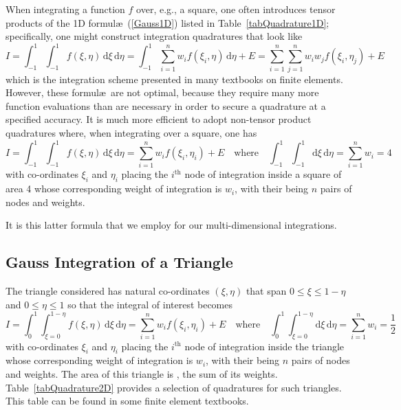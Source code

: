When integrating a function $f$ over, e.g., a square, one often introduces tensor products of the 1D formul\ae\ (\ref{Gauss1D}) listed in Table~\ref{tabQuadrature1D}; specifically, one might construct integration quadratures that look like
\begin{displaymath}
    I = \int_{-1}^1 \int_{-1}^1 f ( \xi , \eta ) \, \mathrm{d} \xi \, \mathrm{d} \eta =
    \int_{-1}^1 \sum_{i=1}^n w_i f ( \xi_i , \eta ) \, \mathrm{d} \eta + E =
    \sum_{i=1}^n \sum_{j=1}^n w_i w_j f ( \xi_i , \eta_ j ) + E 
\end{displaymath}
which is the integration scheme presented in many textbooks on finite elements.  However, these formul\ae\ are not optimal, because they require many more function evaluations than are necessary in order to secure a quadrature at a specified accuracy.  It is much more efficient to adopt non-tensor product quadratures where, when integrating over a square, one has
\begin{displaymath}
    I = \int_{-1}^1 \int_{-1}^1 f ( \xi , \eta ) \, \mathrm{d} \xi \, \mathrm{d} \eta =
    \sum_{i=1}^n w_i f ( \xi_i , \eta_i ) + E
    \quad \text{where} \quad
    \int_{-1}^1 \int_{-1}^1 \mathrm{d} \xi \, \mathrm{d} \eta = 
    \sum_{i=1}^n w_i = 4
\end{displaymath}
with co-ordinates $\xi_i$ and $\eta_i$ placing the $i^{\text{th}}$ node of integration inside a square of area 4 whose corresponding weight of integration is $w_i$, with their being $n$ pairs of nodes and weights.  

It is this latter formula that we employ for our multi-dimensional integrations.

\subsection{Gauss Integration of a Triangle}

The triangle considered has natural co-ordinates $( \xi , \eta )$ that span $0 \leq \xi \leq 1-\eta$ and $0 \leq \eta \leq 1$ so that the integral of interest becomes
\begin{equation}
I = \int_0^1 \int_{\xi =0}^{1-\eta} f ( \xi , \eta ) \, \mathrm{d} \xi \, \mathrm{d} \eta =
\sum_{i=1}^n w_i f ( \xi_i , \eta_i ) + E
\quad \text{where} \quad
\int_0^1 \int_{\xi =0}^{1-\eta} \mathrm{d} \xi \, \mathrm{d} \eta = 
\sum_{i=1}^n w_i = \frac{1}{2}
\label{GaussTriangle}
\end{equation}
with co-ordinates $\xi_i$ and $\eta_i$ placing the $i^{\text{th}}$ node of integration inside the triangle whose corresponding weight of integration is $w_i$, with their being $n$ pairs of nodes and weights.  The area of this triangle is , the sum of its weights. Table~\ref{tabQuadrature2D} provides a selection of quadratures for such triangles.  This table can be found in some finite element textbooks.

